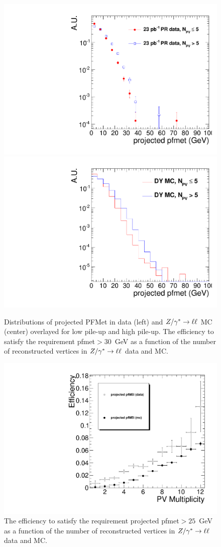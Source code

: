 \begin{figure}[hbt]
\begin{center}
\includegraphics[width=0.4\linewidth]{figures/pfmet_data.pdf} 
\includegraphics[width=0.4\linewidth]{figures/pfmet_dymc.pdf}
\caption{\label{fig:met_pu}\protect Distributions of projected PFMet in data (left) and $Z/\gamma^*\to\ell\ell$ MC (center) 
overlayed for low pile-up and high pile-up. The efficiency to satisfy the requirement pfmet$>30$~GeV as a function
of the number of reconstructed vertices in $Z/\gamma^*\to\ell\ell$ data and MC.}
\end{center}
\begin{center}
\includegraphics[width=0.5\linewidth]{figures/proj_pfmet_Eff25.pdf} 
\caption{\label{fig:meteff_pu}\protect The efficiency to satisfy the requirement projected pfmet$>25$~GeV as a function
of the number of reconstructed vertices in $Z/\gamma^*\to\ell\ell$ data and MC.}
\end{center}
\end{figure}


